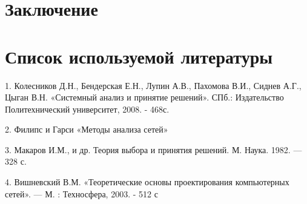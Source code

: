 \documentclass[a4paper, 12pt]{article}		%
\begin{document}

%
\newpage
\section*{Заключение}


%
\newpage
\section*{Список используемой литературы}

1.	Колесников Д.Н., Бендерская Е.Н., Лупин А.В., Пахомова В.И., Сиднев А.Г., Цыган В.Н. «Системный анализ и принятие решений». СПб.: Издательство Политехнический университет, 2008. - 468с.

2.  Филипс и Гарси «Методы анализа сетей»

3.	Макаров И.М., и др. Теория выбора и принятия решений. М. Наука. 1982. — 328 с.

4.	Вишневский В.М. «Теоретические основы проектирования компьютерных сетей». — М. : Техносфера, 2003. - 512 с

\end{document}
